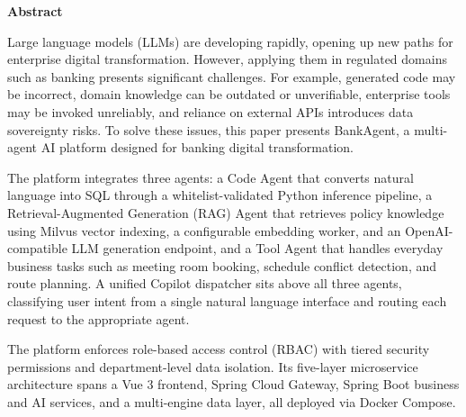 
\begin{center}
{\fontsize{16}{19}\selectfont\textbf{Abstract}}
\end{center}

\vspace{3mm}

Large language models (LLMs) are developing rapidly, opening up new paths for enterprise digital transformation. However, applying them in regulated domains such as banking presents significant challenges. For example, generated code may be incorrect, domain knowledge can be outdated or unverifiable, enterprise tools may be invoked unreliably, and reliance on external APIs introduces data sovereignty risks. To solve these issues, this paper presents BankAgent, a multi-agent AI platform designed for banking digital transformation.

The platform integrates three agents: a Code Agent that converts natural language into SQL through a whitelist-validated Python inference pipeline, a Retrieval-Augmented Generation (RAG) Agent that retrieves policy knowledge using Milvus vector indexing, a configurable embedding worker, and an OpenAI-compatible LLM generation endpoint, and a Tool Agent that handles everyday business tasks such as meeting room booking, schedule conflict detection, and route planning. A unified Copilot dispatcher sits above all three agents, classifying user intent from a single natural language interface and routing each request to the appropriate agent.

The platform enforces role-based access control (RBAC) with tiered security permissions and department-level data isolation. Its five-layer microservice architecture spans a Vue 3 frontend, Spring Cloud Gateway, Spring Boot business and AI services, and a multi-engine data layer, all deployed via Docker Compose.

\newpage

